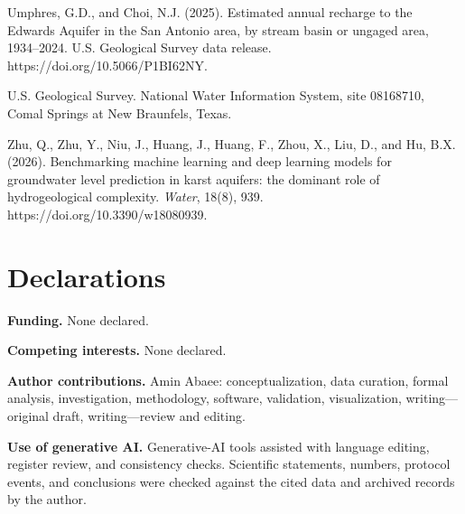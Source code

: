 \documentclass[11pt]{article}
\begin{document}
Umphres, G.D., and Choi, N.J. (2025). Estimated annual recharge to the Edwards Aquifer in the San Antonio area, by stream basin or ungaged area, 1934--2024. U.S. Geological Survey data release. https://doi.org/10.5066/P1BI62NY.

U.S. Geological Survey. National Water Information System, site 08168710, Comal Springs at New Braunfels, Texas.

Zhu, Q., Zhu, Y., Niu, J., Huang, J., Huang, F., Zhou, X., Liu, D., and Hu, B.X. (2026). Benchmarking machine learning and deep learning models for groundwater level prediction in karst aquifers: the dominant role of hydrogeological complexity. \emph{Water}, 18(8), 939. https://doi.org/10.3390/w18080939.

\section*{Declarations}
\textbf{Funding.} None declared.

\textbf{Competing interests.} None declared.

\textbf{Author contributions.} Amin Abaee: conceptualization, data curation, formal analysis, investigation, methodology, software, validation, visualization, writing---original draft, writing---review and editing.

\textbf{Use of generative AI.} Generative-AI tools assisted with language editing, register review, and consistency checks. Scientific statements, numbers, protocol events, and conclusions were checked against the cited data and archived records by the author.
\end{document}
